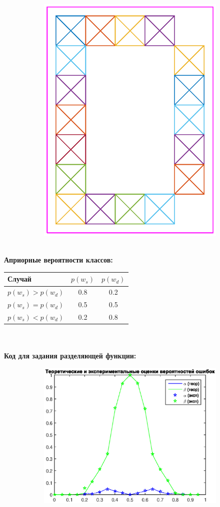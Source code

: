 \documentclass[10pt]{article} %
\begin{document}
\begin{spacing}{1}
\begin{figure}[h]
\begin{subfigure}{.4\textwidth}
		\centering
		\includegraphics[width=.6\linewidth]{dphoto.eps}
	\end{subfigure}
\end{figure}
~\\
\textbf{Априорные вероятности классов:}
~\\
\begin{tabular}{| l | c | c |}
	\hline			
	Случай & $p(w_s)$ & $p(w_d)$ \\
	\hline	
	$p(w_s) > p(w_d)$ & 0.8 & 0.2 \\
	\hline	
	$p(w_s) = p(w_d)$ & 0.5 & 0.5 \\
	\hline  
	$p(w_s) < p(w_d)$ & 0.2 & 0.8 \\
	\hline  
\end{tabular}
~\\
~\\
\textbf{Код для задания разделяющей функции:}
 
\begin{figure}[h]
	\centering
	\begin{subfigure}{.5\textwidth}
		\centering
		\includegraphics[width=1.1\linewidth]{Sd1.eps}

\end{subfigure}
\end{figure}
\end{spacing}
\end{document}
